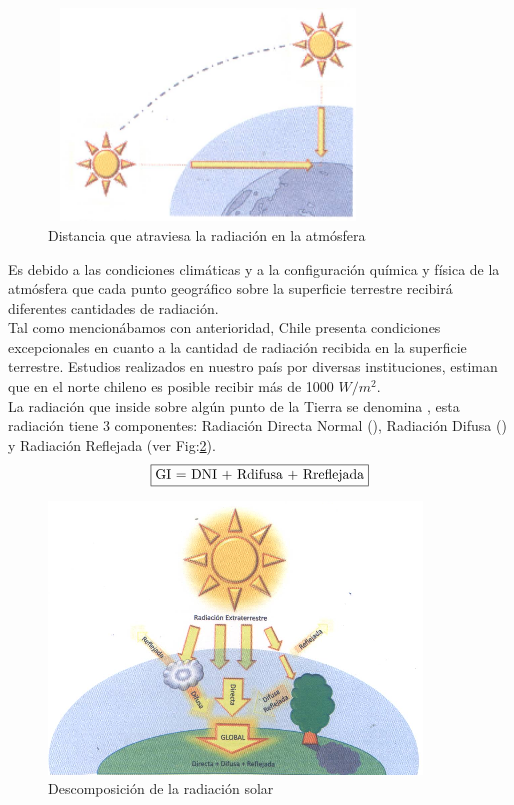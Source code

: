 \begin{figure}[h!]
        \centering
        \includegraphics[width=240pt,height=160pt]{images/espesorAtmosfera}
        \caption{Distancia que atraviesa la radiación en la atmósfera}
	\label{fig:atmosfera}
\end{figure}
\newpage

Es debido a las condiciones climáticas y a la configuración química y física de la atmósfera que cada punto geográfico sobre la superficie terrestre recibirá diferentes cantidades de radiación.\\

Tal como mencionábamos con anterioridad, Chile presenta condiciones excepcionales en cuanto a la cantidad de radiación recibida en la superficie terrestre. Estudios realizados en nuestro país por diversas instituciones\cite{recursoSolar:2}, estiman que en el norte chileno es posible recibir más de 1000 $W/{m}^{2}$.\\

La radiación que inside sobre algún punto de la Tierra se denomina , esta radiación tiene 3 componentes: Radiación Directa Normal (), Radiación Difusa () y Radiación Reflejada (ver Fig:\ref{fig:componentes}).
$$\fbox{GI = DNI + Rdifusa + Rreflejada}$$

\begin{figure}[h!]
        \centering
        \includegraphics[scale=0.6]{images/radiacionDescompocicion}
        \caption{Descomposición de la radiación solar\cite{recursoSolar:1}}
	\label{fig:componentes}
\end{figure}

